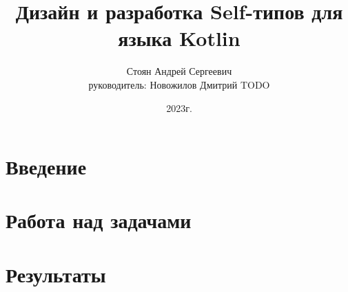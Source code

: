 \documentclass[handout,aspectratio=43]{beamer}
\author[Андрей Стоян]{Стоян Андрей Сергеевич\\ {\small руководитель:} Новожилов Дмитрий TODO}
\institute[ИТМО/SE]{Национальный исследовательский университет ИТМО\\Разработка программного обеспечения/Software engineering}
\title[Self-типы в языке Kotlin]{Дизайн и разработка Self-типов для языка Kotlin}
\date{2023г.}
\begin{document}
\maketitle

\section{Введение}

\section{Работа над задачами}

\section{Результаты}
\end{document}
